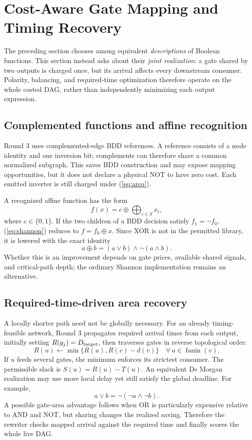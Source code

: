 \documentclass[journal,10pt]{IEEEtran}
\begin{document}
\section{Cost-Aware Gate Mapping and Timing Recovery}
The preceding section chooses among equivalent \emph{descriptions} of Boolean functions. This section instead asks about their \emph{joint realization}: a gate shared by two outputs is charged once, but its arrival affects every downstream consumer. Polarity, balancing, and required-time optimization therefore operate on the whole costed DAG, rather than independently minimizing each output expression.
\subsection{Complemented functions and affine recognition}
Round 3 uses complemented-edge BDD references. A reference consists of a node identity and one inversion bit; complements can therefore share a common normalized subgraph. This saves BDD construction and may expose mapping opportunities, but it does not declare a physical NOT to have zero cost. Each emitted inverter is still charged under (\ref{eq:area}).

A recognized affine function has the form
\begin{equation}
 f(x)=c\oplus\bigoplus_{i\in S}x_i,
\end{equation}
where $c\in\{0,1\}$. If the two children of a BDD decision satisfy $f_1=\neg f_0$, (\ref{eq:shannon}) reduces to $f=f_0\oplus x$. Since XOR is not in the permitted library, it is lowered with the exact identity
\begin{equation}
 a\oplus b=(a\lor b)\land\neg(a\land b).
\end{equation}
Whether this is an improvement depends on gate prices, available shared signals, and critical-path depth; the ordinary Shannon implementation remains an alternative.

\subsection{Required-time-driven area recovery}
A locally shorter path need not be globally necessary. For an already timing-feasible network, Round 3 propagates required arrival times from each output, initially setting $R(y_j)=D_{\rm target}$, then traverses gates in reverse topological order:
\begin{equation}\label{eq:required}
 R(u)\leftarrow\min\{R(u),R(v)-d(v)\}
 \quad\forall\,u\in\operatorname{fanin}(v).
\end{equation}
If $u$ feeds several gates, the minimum enforces its strictest consumer. The permissible slack is $S(u)=R(u)-T(u)$. An equivalent De Morgan realization may use more local delay yet still satisfy the global deadline. For example,
\begin{equation}
 a\lor b=\neg(\neg a\land\neg b).
\end{equation}
A possible gate-area advantage follows when OR is particularly expensive relative to AND and NOT, but sharing changes the realized saving. Therefore the rewriter checks mapped arrival against the required time and finally scores the whole live DAG.
\end{document}
